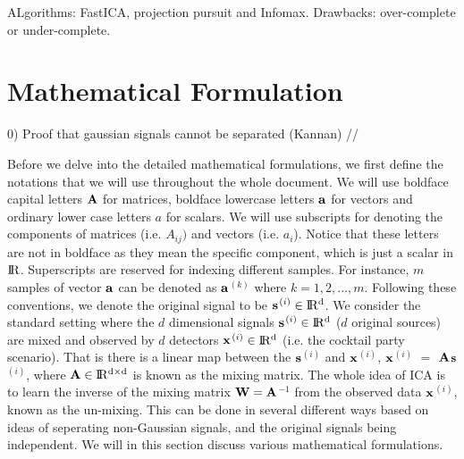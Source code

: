 \documentclass[aps,prl,preprint,superscriptaddress]{revtex4-2}
\begin{document}
ALgorithms: FastICA, projection pursuit and Infomax. Drawbacks: over-complete or under-complete.





\section{Mathematical Formulation}
0) Proof that gaussian signals cannot be separated (Kannan)
//

Before we delve into the detailed mathematical formulations, we first define the notations that we will use throughout the whole document. We will use boldface capital letters $\bf{A}$ for matrices, boldface lowercase letters $\bf{a}$ for vectors and ordinary lower case letters $a$ for scalars. We will use subscripts for denoting the components of matrices (i.e. $A_{ij})$ and vectors (i.e. $a_{i}$). Notice that these letters are not in boldface as they mean the specific component, which is just a scalar in $ \rm I\!R$. Superscripts are reserved for indexing different samples. For instance, $m$ samples of vector $\bf{a}$ can be denoted as $\bf{a}$$^{(k)}$ where $k = 1, 2, ..., m$. Following these conventions, we denote the original signal to be $\bf{s}$$^{(i)} \in \rm I\!R^{d}$. We consider the standard setting where the $d$ dimensional signals $\bf{s}$$^{(i)} \in \rm I\!R^{d}$ ($d$ original sources) are mixed and observed by $d$ detectors $\bf{x}$$^{(i)} \in \rm I\!R^{d}$ (i.e. the cocktail party scenario). That is there is a linear map between the $\bf{s}$$^{(i)}$ and $\bf{x}$$^{(i)}$, $\bf{x}$$^{(i)}$ $=$ $\bf{A}$$\bf{s}$$^{(i)}$, where $\bf{A} \in \rm I\!R^{d\times d}$ is known as the mixing matrix. The whole idea of ICA is to learn the inverse of the mixing matrix $\bf{W} = \bf{A}$$^{-1}$ from the observed data $\bf{x}$$^{(i)}$, known as the un-mixing. This can be done in several different ways based on ideas of seperating non-Gaussian signals, and the original signals being independent. We will in this section discuss various mathematical formulations. 
\end{document}

